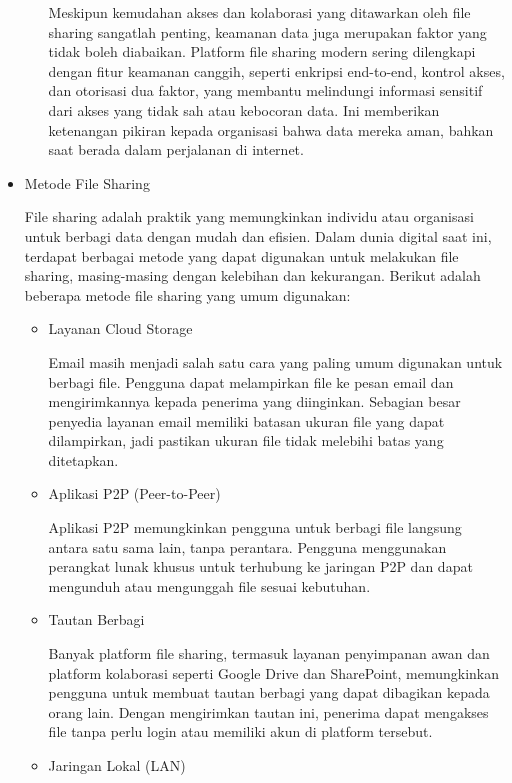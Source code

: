 \documentclass[12pt]{article}
\begin{document}
\begin{itemize}
\begin{itemize}
       Meskipun kemudahan akses dan kolaborasi yang ditawarkan oleh file sharing sangatlah penting, keamanan data juga merupakan faktor yang tidak boleh diabaikan. Platform file sharing modern sering dilengkapi dengan fitur keamanan canggih, seperti enkripsi end-to-end, kontrol akses, dan otorisasi dua faktor, yang membantu melindungi informasi sensitif dari akses yang tidak sah atau kebocoran data. Ini memberikan ketenangan pikiran kepada organisasi bahwa data mereka aman, bahkan saat berada dalam perjalanan di internet.
       \vspace{2pt}
    \end{itemize}
    \item Metode File Sharing

    File sharing adalah praktik yang memungkinkan individu atau organisasi untuk berbagi data dengan mudah dan efisien. Dalam dunia digital saat ini, terdapat berbagai metode yang dapat digunakan untuk melakukan file sharing, masing-masing dengan kelebihan dan kekurangan. Berikut adalah beberapa metode file sharing yang umum digunakan:

    \begin{itemize}
        \item Layanan Cloud Storage

        Email masih menjadi salah satu cara yang paling umum digunakan untuk berbagi file. Pengguna dapat melampirkan file ke pesan email dan mengirimkannya kepada penerima yang diinginkan. Sebagian besar penyedia layanan email memiliki batasan ukuran file yang dapat dilampirkan, jadi pastikan ukuran file tidak melebihi batas yang ditetapkan.
        \item Aplikasi P2P (Peer-to-Peer)

        Aplikasi P2P memungkinkan pengguna untuk berbagi file langsung antara satu sama lain, tanpa perantara. Pengguna menggunakan perangkat lunak khusus untuk terhubung ke jaringan P2P dan dapat mengunduh atau mengunggah file sesuai kebutuhan.
        
        \item Tautan Berbagi

        Banyak platform file sharing, termasuk layanan penyimpanan awan dan platform kolaborasi seperti Google Drive dan SharePoint, memungkinkan pengguna untuk membuat tautan berbagi yang dapat dibagikan kepada orang lain. Dengan mengirimkan tautan ini, penerima dapat mengakses file tanpa perlu login atau memiliki akun di platform tersebut.
        \item Jaringan Lokal (LAN)


\end{itemize}
\end{itemize}
\end{document}
